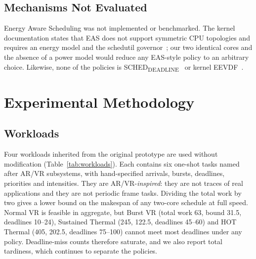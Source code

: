 \documentclass[conference]{IEEEtran}
\begin{document}
\subsection{Mechanisms Not Evaluated}\label{sec:pol-eas}
Energy Aware Scheduling was not implemented or benchmarked. The kernel documentation states that EAS does not support symmetric CPU topologies and requires an energy model and the schedutil governor~\cite{kdoc_eas}; our two identical cores and the absence of a power model would reduce any EAS-style policy to an arbitrary choice. Likewise, none of the policies is SCHED\textsubscript{DEADLINE}~\cite{kdoc_deadline} or kernel EEVDF~\cite{kdoc_eevdf}.

\section{Experimental Methodology}\label{sec:method}
\subsection{Workloads}\label{sec:method-workloads}
Four workloads inherited from the original prototype are used without modification (Table~\ref{tab:workloads}). Each contains six one-shot tasks named after AR/VR subsystems, with hand-specified arrivals, bursts, deadlines, priorities and intensities. They are AR/VR-\emph{inspired}: they are not traces of real applications and they are not periodic frame tasks. Dividing the total work by two gives a lower bound on the makespan of any two-core schedule at full speed. Normal VR is feasible in aggregate, but Burst VR (total work 63, bound 31.5, deadlines 10--24), Sustained Thermal (245, 122.5, deadlines 45--60) and HOT Thermal (405, 202.5, deadlines 75--100) cannot meet most deadlines under any policy. Deadline-miss counts therefore saturate, and we also report total tardiness, which continues to separate the policies.
\end{document}
